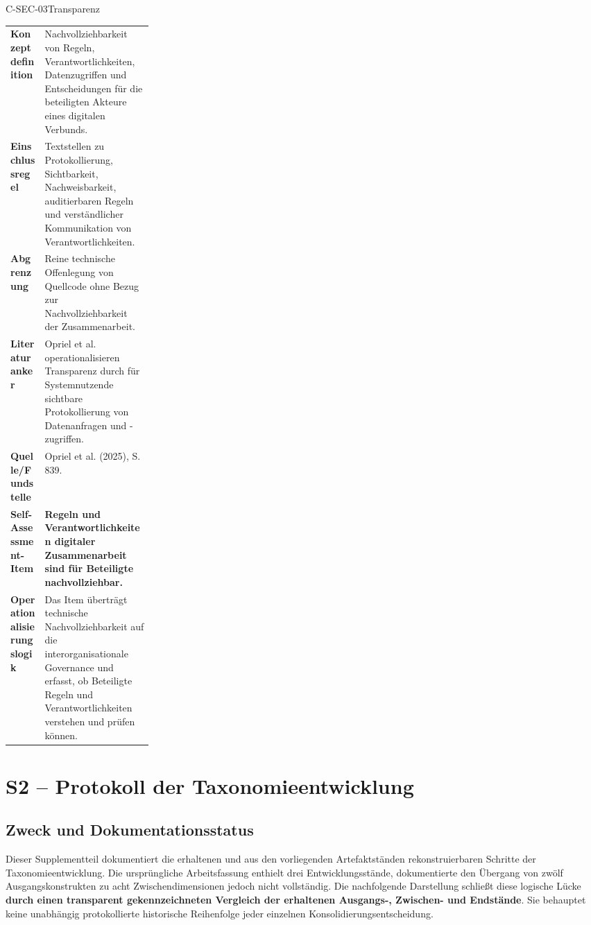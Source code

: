 \documentclass[10pt,a4paper]{article}
\begin{document}
\begin{codecard}{C-SEC-03}{Transparenz}
\begin{tabularx}{\linewidth}{@{}>{\RaggedRight\arraybackslash\bfseries\color{DeepNavy}}p{0.245\linewidth}>{\RaggedRight\arraybackslash}X@{}}
Konzeptdefinition & Nachvollziehbarkeit von Regeln, Verantwortlichkeiten, Datenzugriffen und Entscheidungen für die beteiligten Akteure eines digitalen Verbunds. \\
\arrayrulecolor{SoftRule}\hline
Einschlussregel & Textstellen zu Protokollierung, Sichtbarkeit, Nachweisbarkeit, auditierbaren Regeln und verständlicher Kommunikation von Verantwortlichkeiten. \\
\arrayrulecolor{SoftRule}\hline
Abgrenzung & Reine technische Offenlegung von Quellcode ohne Bezug zur Nachvollziehbarkeit der Zusammenarbeit. \\
\arrayrulecolor{SoftRule}\hline
Literaturanker & Opriel et al. operationalisieren Transparenz durch für Systemnutzende sichtbare Protokollierung von Datenanfragen und -zugriffen. \\
\arrayrulecolor{SoftRule}\hline
Quelle/Fundstelle & Opriel et al. (2025), S. 839. \\
\arrayrulecolor{SoftRule}\hline
Self-Assessment-Item & \textbf{Regeln und Verantwortlichkeiten digitaler Zusammenarbeit sind für Beteiligte nachvollziehbar.} \\
\arrayrulecolor{SoftRule}\hline
Operationalisierungslogik & Das Item überträgt technische Nachvollziehbarkeit auf die interorganisationale Governance und erfasst, ob Beteiligte Regeln und Verantwortlichkeiten verstehen und prüfen können. \\
\end{tabularx}
\end{codecard}

\clearpage
\section{S2 – Protokoll der Taxonomieentwicklung}
\label{supp:s2}

\subsection{Zweck und Dokumentationsstatus}

Dieser Supplementteil dokumentiert die erhaltenen und aus den vorliegenden Artefaktständen rekonstruierbaren Schritte der Taxonomieentwicklung. Die ursprüngliche Arbeitsfassung enthielt drei Entwicklungsstände, dokumentierte den Übergang von zwölf Ausgangskonstrukten zu acht Zwischendimensionen jedoch nicht vollständig. Die nachfolgende Darstellung schließt diese logische Lücke \textbf{durch einen transparent gekennzeichneten Vergleich der erhaltenen Ausgangs-, Zwischen- und Endstände}. Sie behauptet keine unabhängig protokollierte historische Reihenfolge jeder einzelnen Konsolidierungsentscheidung.
\end{document}
